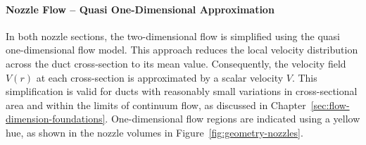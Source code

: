 \paragraph{Nozzle Flow -- Quasi One-Dimensional Approximation}
	In both nozzle sections, the two-dimensional flow is simplified using the quasi one-dimensional flow model.
	This approach reduces the local velocity distribution across the duct cross-section to its mean value.
	Consequently, the velocity field $V(r)$ at each cross-section is approximated by a scalar velocity $V$.
	This simplification is valid for ducts with reasonably small variations in cross-sectional area and within the limits of continuum flow, as discussed in Chapter~\ref{sec:flow-dimension-foundations}.
	One-dimensional flow regions are indicated using a yellow hue, as shown in the nozzle volumes in Figure~\ref{fig:geometry-nozzles}.
	\cite{anderson2021modern}

